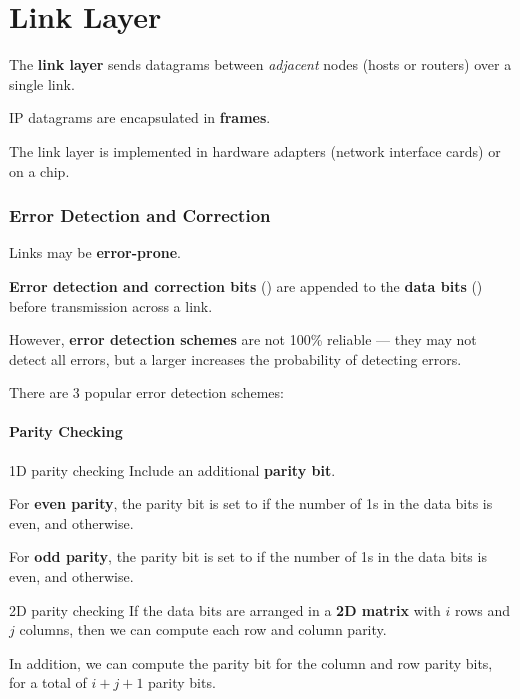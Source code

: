 \part{Link Layer}

The \textbf{link layer} sends datagrams between \textit{adjacent} nodes
(hosts or routers) over a single link.

IP datagrams are encapsulated in \textbf{frames}.

The link layer is implemented in hardware adapters (network interface cards) or on a chip.


\section{Error Detection and Correction}
Links may be \textbf{error-prone}.

\textbf{Error detection and correction bits} () are appended to the \textbf{data bits} ()
before transmission across a link.

However, \textbf{error detection schemes} are not 100\% reliable --- they may not detect all errors,
but a larger  increases the probability of detecting errors.

There are 3 popular error detection schemes:
\begin{enumerate}
\end{enumerate}

\subsection{Parity Checking}
\begin{defn}{1D parity checking}
    Include an additional \textbf{parity bit}.

    For \textbf{even parity}, the parity bit is set to  if the number of 1s in the data bits is even,
    and  otherwise.

    For \textbf{odd parity}, the parity bit is set to  if the number of 1s in the data bits is even,
    and  otherwise.
\end{defn}

\begin{defn}{2D parity checking}
    If the data bits are arranged in a \textbf{2D matrix} with $i$ rows and $j$ columns,
    then we can compute each row and column parity.

    In addition, we can compute the parity bit for the column and row parity bits,
    for a total of $i + j + 1$ parity bits.
\end{defn}

